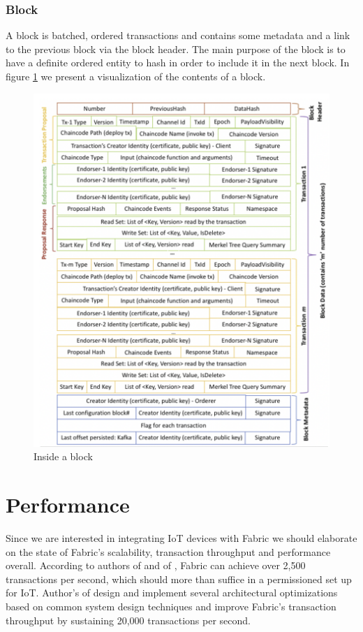 \subsubsection{Block}
A block is batched, ordered transactions and contains some metadata and a link to the previous block via the block header. The main purpose of the block is to have a definite ordered entity to hash in order to include it in the next block. In figure \ref{fig:block} we present a visualization of the contents of a block.
\begin{figure}[ht]  
    \centering
    \includegraphics[width=1\textwidth]{images/4_Fabric/block.png}
    \caption{Inside a block \cite{thakkar2018performance}}
    \label{fig:block}
\end{figure}

\section{Performance}
Since we are interested in integrating IoT devices with Fabric we should elaborate on the state of Fabric's scalability, transaction throughput and performance overall. According to authors of  \cite{thakkar2018performance} and of \cite{androulaki2018hyperledger}, Fabric can achieve over 2,500 transactions per second, which should more than suffice in a permissioned set up for IoT. 
Author's of \cite{gorenflo2019fastfabric} design and implement several architectural optimizations based on common system design techniques and improve Fabric's transaction throughput by sustaining 20,000 transactions per second. 

